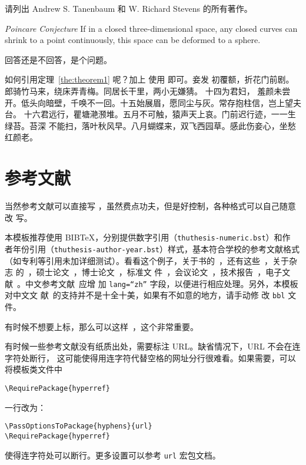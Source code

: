 \begin{exercise}
  请列出 Andrew S. Tanenbaum 和 W. Richard Stevens 的所有著作。
\end{exercise}

\begin{conjecture} \textit{Poincare Conjecture} If in a closed three-dimensional
  space, any closed curves can shrink to a point continuously, this space can be
  deformed to a sphere.
\end{conjecture}

\begin{problem}
 回答还是不回答，是个问题。
\end{problem}

如何引用定理~\ref{the:theorem1} 呢？加上  使用  即可。妾发
初覆额，折花门前剧。郎骑竹马来，绕床弄青梅。同居长干里，两小无嫌猜。 十四为君妇，
羞颜未尝开。低头向暗壁，千唤不一回。十五始展眉，愿同尘与灰。常存抱柱信，岂上望夫
台。 十六君远行，瞿塘滟滪堆。五月不可触，猿声天上哀。门前迟行迹，一一生绿苔。苔深
不能扫，落叶秋风早。八月蝴蝶来，双飞西园草。感此伤妾心，坐愁红颜老。

\section{参考文献}
\label{sec:bib}
当然参考文献可以直接写 ，虽然费点功夫，但是好控制，各种格式可以自己随意改
写。

本模板推荐使用 BIB\TeX，分别提供数字引用（\texttt{thuthesis-numeric.bst}）和作
者年份引用（\texttt{thuthesis-author-year.bst}）样式，基本符合学校的参考文献格式
（如专利等引用未加详细测试）。看看这个例子，关于书的~\cite{tex, companion,
  ColdSources}，还有这些~\cite{Krasnogor2004e, clzs, zjsw}，关于杂志
的~\cite{ELIDRISSI94, MELLINGER96, SHELL02}，硕士论文~\cite{zhubajie,
  metamori2004}，博士论文~\cite{shaheshang, FistSystem01}，标准文
件~\cite{IEEE-1363}，会议论文~\cite{DPMG,kocher99}，技术报告~\cite{NPB2}，电子文
献~\cite{chuban2001,oclc2000}。中文参考文献~\cite{cnarticle}应增
加 \texttt{lang=``zh''} 字段，以便进行相应处理。另外，本模板对中文文
献~\cite{cnproceed}的支持并不是十全十美，如果有不如意的地方，请手动修
改 \texttt{bbl} 文件。

有时候不想要上标，那么可以这样~，这个非常重要。

有时候一些参考文献没有纸质出处，需要标注 URL。缺省情况下，URL 不会在连字符处断行，
这可能使得用连字符代替空格的网址分行很难看。如果需要，可以将模板类文件中
\begin{verbatim}
\RequirePackage{hyperref}
\end{verbatim}
一行改为：
\begin{verbatim}
\PassOptionsToPackage{hyphens}{url}
\RequirePackage{hyperref}
\end{verbatim}
使得连字符处可以断行。更多设置可以参考 \texttt{url} 宏包文档。

